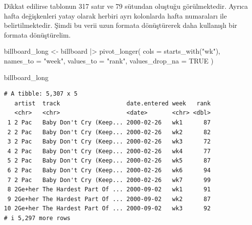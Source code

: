 \documentclass[
  letterpaper,
  DIV=11,
  numbers=noendperiod]{scrreprt}
\newenvironment{Shaded}{\begin{snugshade}}{\end{snugshade}}
\newcommand{\AttributeTok}[1]{\textcolor[rgb]{0.40,0.45,0.13}{#1}}
\newcommand{\ConstantTok}[1]{\textcolor[rgb]{0.56,0.35,0.01}{#1}}
\newcommand{\FunctionTok}[1]{\textcolor[rgb]{0.28,0.35,0.67}{#1}}
\newcommand{\NormalTok}[1]{\textcolor[rgb]{0.00,0.23,0.31}{#1}}
\newcommand{\OtherTok}[1]{\textcolor[rgb]{0.00,0.23,0.31}{#1}}
\newcommand{\SpecialCharTok}[1]{\textcolor[rgb]{0.37,0.37,0.37}{#1}}
\newcommand{\StringTok}[1]{\textcolor[rgb]{0.13,0.47,0.30}{#1}}
\begin{document}
Dikkat edilirse tablonun 317 satır ve 79 sütundan oluştuğu
görülmektedir. Ayrıca hafta değişkenleri yatay olarak herbiri ayrı
kolonlarda hafta numaraları ile belirtilmektedir. Şimdi bu verii uzun
formata dönüştürerek daha kullanışlı bir formata dönüştürelim.

\begin{Shaded}
\begin{Highlighting}[]
\NormalTok{billboard\_long }\OtherTok{\textless{}{-}}\NormalTok{ billboard }\SpecialCharTok{|\textgreater{}} 
  \FunctionTok{pivot\_longer}\NormalTok{(}
    \AttributeTok{cols =} \FunctionTok{starts\_with}\NormalTok{(}\StringTok{"wk"}\NormalTok{), }
    \AttributeTok{names\_to =} \StringTok{"week"}\NormalTok{, }
    \AttributeTok{values\_to =} \StringTok{"rank"}\NormalTok{,}
    \AttributeTok{values\_drop\_na =} \ConstantTok{TRUE}
\NormalTok{  )}

\NormalTok{billboard\_long}
\end{Highlighting}
\end{Shaded}

\begin{verbatim}
# A tibble: 5,307 x 5
   artist  track                   date.entered week   rank
   <chr>   <chr>                   <date>       <chr> <dbl>
 1 2 Pac   Baby Don't Cry (Keep... 2000-02-26   wk1      87
 2 2 Pac   Baby Don't Cry (Keep... 2000-02-26   wk2      82
 3 2 Pac   Baby Don't Cry (Keep... 2000-02-26   wk3      72
 4 2 Pac   Baby Don't Cry (Keep... 2000-02-26   wk4      77
 5 2 Pac   Baby Don't Cry (Keep... 2000-02-26   wk5      87
 6 2 Pac   Baby Don't Cry (Keep... 2000-02-26   wk6      94
 7 2 Pac   Baby Don't Cry (Keep... 2000-02-26   wk7      99
 8 2Ge+her The Hardest Part Of ... 2000-09-02   wk1      91
 9 2Ge+her The Hardest Part Of ... 2000-09-02   wk2      87
10 2Ge+her The Hardest Part Of ... 2000-09-02   wk3      92
# i 5,297 more rows
\end{verbatim}
\end{document}
